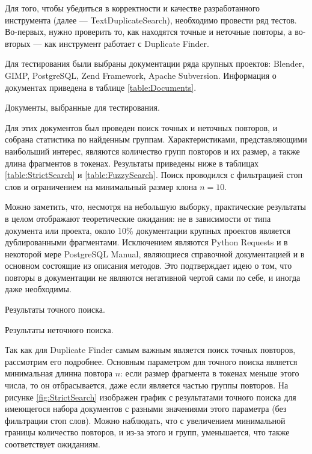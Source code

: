 \documentclass[14pt]{matmex-diploma-custom}
\begin{document}
Для того, чтобы убедиться в корректности и качестве разработанного инструмента (далее --- TextDuplicateSearch), необходимо провести ряд тестов. Во-первых, нужно проверить то, как находятся точные и неточные повторы, а во-вторых --- как инструмент работает с Duplicate Finder.

Для тестирования были выбраны документации ряда крупных проектов: Blender, GIMP, PostgreSQL, Zend Framework, Apache Subversion. Информация о документах приведена в таблице \ref{table:Documents}. 

\begin{table}[ht!]
	\centering
	
	\caption{Документы, выбранные для тестирования.}
	\label{table:Documents}
\end{table}

Для этих документов был проведен поиск точных и неточных повторов, и собрана статистика по найденным группам. Характеристиками, представляющими наибольший интерес, являются количество групп повторов и их размер, а также длина фрагментов в токенах. Результаты приведены ниже в таблицах \ref{table:StrictSearch} и \ref{table:FuzzySearch}. Поиск проводился с фильтрацией стоп слов и ограничением на минимальный размер клона $n=10$.

Можно заметить, что, несмотря на небольшую выборку, практические результаты в целом отображают теоретические ожидания: не в зависимости от типа документа или проекта, около 10\% документации крупных проектов является дублированными фрагментами. Исключением являются Python Requests и в некоторой мере PostgreSQL Manual, являющиеся справочной документацией и в основном состоящие из описания методов. Это подтверждает идею о том, что повторы в документации не являются негативной чертой сами по себе, и иногда даже необходимы.

\begin{table}[ht!]
	\centering
	
	\caption{Результаты точного поиска.}
	\label{table:StrictSearch}
\end{table}

\begin{table}[ht!]
	\centering
	
	\caption{Результаты неточного поиска.}
	\label{table:FuzzySearch}
\end{table}

\newpage
Так как для Duplicate Finder самым важным является поиск точных повторов, рассмотрим его подробнее. Основным параметром для точного поиска является минимальная длинна повтора $n$: если размер фрагмента в токенах меньше этого числа, то он отбрасывается, даже если является частью группы повторов. На рисунке \ref{fig:StrictSearch} изображен график с результатами точного поиска для имеющегося набора документов с разными значениями этого параметра (без фильтрации стоп слов). Можно наблюдать, что с увеличением минимальной границы количество повторов, и из-за этого и групп, уменьшается, что также соответствует ожиданиям.
\end{document}
